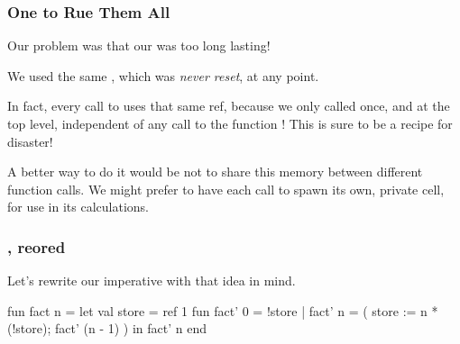 \documentclass[aspectratio=169, handout]{beamer}
\begin{document}
\begin{frame}[fragile]
  \frametitle{One  to Rue Them All}

  Our problem was that our  was too long lasting!

  \vspace{\fill}

  We used the same , which was \textit{never reset}, at any point.

  \pause
  \vspace{\fill}

  In fact, every call to  uses that same ref, because we only called
   once, and at the top level, independent of any call to the function
  ! This is sure to be a recipe for disaster!

  \pause
  \vspace{\fill}

  A better way to do it would be not to share this memory between different function
  calls. We might prefer to have each call to  spawn its own, private
   cell, for use in its calculations.
\end{frame}

\begin{frame}[fragile]
  \frametitle{, reored}

  Let's rewrite our imperative  with that idea in mind.

  \pause
  \vspace{\fill}

  \begin{codeblock}
    fun fact n =
      let
        val store = ref 1
        fun fact' 0 = !store
          | fact' n =
              ( store := n * (!store);
                fact' (n - 1)
              )
      in
        fact' n
      end
  \end{codeblock}
\end{frame}
\end{document}
